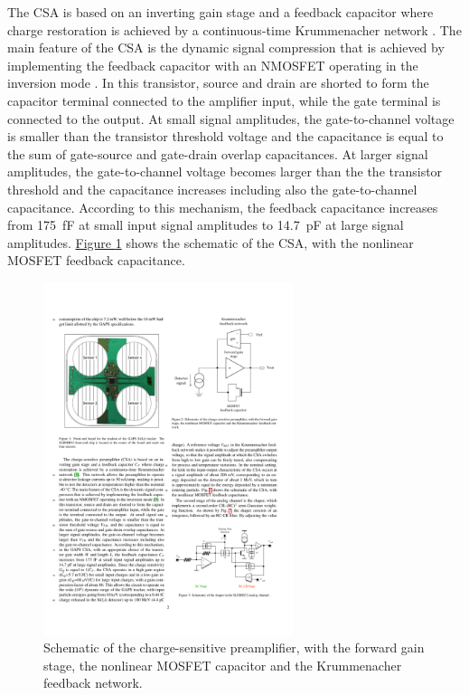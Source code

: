 \par
The CSA is based on an inverting gain stage and a feedback capacitor where charge restoration is achieved by a continuous-time Krummenacher network \cite{krummenacher_1991_pixel}. The main feature of the CSA is the dynamic signal compression that is achieved by implementing the feedback capacitor with an NMOSFET operating in the inversion mode \cite{manghisoni_2018_dynamic}. In this transistor, source and drain are shorted to form the capacitor terminal connected to the amplifier input, while the gate terminal is connected to the output. At small signal amplitudes, the gate-to-channel voltage is smaller than the transistor threshold voltage and the capacitance is equal to the sum of gate-source and gate-drain overlap capacitances. At larger signal amplitudes, the gate-to-channel voltage becomes larger than the the transistor threshold and the capacitance increases including also the gate-to-channel capacitance. According to this mechanism, the feedback capacitance increases from \SI{175}{\femto\farad} at small input signal amplitudes to \SI{14.7}{\pico\farad} at large signal amplitudes. \hyperref[figCSAschematic]{Figure \ref{figCSAschematic}} shows the schematic of the CSA, with the nonlinear MOSFET feedback capacitance.

\begin{figure}[h!]
    \centering
    \includegraphics[width=0.65\textwidth]{Images/chap1/CSA_schematic.pdf}
    \caption{Schematic of the charge-sensitive preamplifier, with the forward gain stage, the nonlinear MOSFET capacitor and the Krummenacher feedback network.}
    \label{figCSAschematic}
\end{figure}

